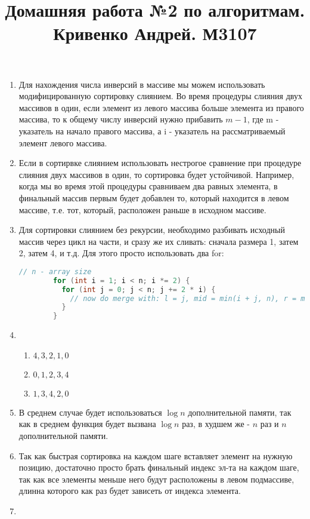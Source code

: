 \documentclass{article}
\title{Домашняя работа №2 по алгоритмам. Кривенко Андрей. М3107}
\begin{document}
\maketitle
\begin{enumerate}
  \item Для нахождения числа инверсий в массиве мы можем использовать модифицированную сортировку слиянием. Во время процедуры слияния двух массивов в один, если элемент из левого массива больше элемента из правого массива, то к общему числу инверсий нужно прибавить $m - 1$, где m - указатель на начало правого массива, а i - указатель на рассматриваемый элемент левого массива.
  \item Если в сортирвке слиянием использовать нестрогое сравнение при процедуре слияния двух массивов в один, то сортировка будет устойчивой. Например, когда мы во время этой процедуры сравниваем два равных элемента, в финальный массив первым будет добавлен то, который находится в левом массиве, т.е. тот, который, расположен раньше в исходном массиве.
  \item Для сортировки слиянием без рекурсии, необходимо разбивать исходный массив через цикл на части, и сразу же их сливать: сначала размера 1, затем 2, затем 4, и т.д. Для этого просто использовать два for:
      \begin{lstlisting}[language=c++]
        // n - array size 
        for (int i = 1; i < n; i *= 2) {
          for (int j = 0; j < n; j += 2 * i) {
            // now do merge with: l = j, mid = min(i + j, n), r = min(i * 2 + j, n)
          }
        }
      \end{lstlisting}
    \item \begin{enumerate}
        \item ${4, 3, 2, 1, 0}$
        \item ${0, 1, 2, 3, 4}$
        \item ${1, 3, 4, 2, 0}$
      \end{enumerate}
    \item В среднем случае будет использоваться $\log{n}$ дополнительной памяти, так как в среднем функция будет вызвана $\log{n}$ раз, в худшем же - $n$ раз и $n$ дополнительной памяти.
    \item Так как быстрая сортировка на каждом шаге вставляет элемент на нужную позицию, достаточно просто брать финальный индекс эл-та на каждом шаге, так как все элементы меньше него будут расположены в левом подмассиве, длинна которого как раз будет зависеть от индекса элемента.
    \item 

\end{enumerate}
\end{document}
